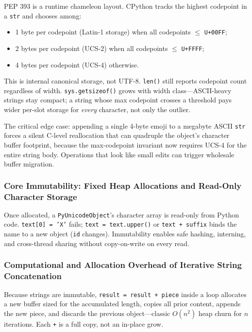 \documentclass[a4paper,twoside]{report}
\begin{document}
PEP 393 is a runtime chameleon layout. CPython tracks the highest codepoint in a \texttt{str} and chooses among:

\begin{itemize}
    \item 1 byte per codepoint (Latin-1 storage) when all codepoints $\leq$ \texttt{U+00FF};
    \item 2 bytes per codepoint (UCS-2) when all codepoints $\leq$ \texttt{U+FFFF};
    \item 4 bytes per codepoint (UCS-4) otherwise.
\end{itemize}

This is internal canonical storage, not UTF-8. \texttt{len()} still reports codepoint count regardless of width. \texttt{sys.getsizeof()} grows with width class---ASCII-heavy strings stay compact; a string whose max codepoint crosses a threshold pays wider per-slot storage for \emph{every} character, not only the outlier.

The critical edge case: appending a single 4-byte emoji to a megabyte ASCII \texttt{str} forces a silent C-level reallocation that can quadruple the object's character buffer footprint, because the max-codepoint invariant now requires UCS-4 for the entire string body. Operations that look like small edits can trigger wholesale buffer migration.

\subsubsection{Core Immutability: Fixed Heap Allocations and Read-Only Character Storage}

Once allocated, a \texttt{PyUnicodeObject}'s character array is read-only from Python code. \texttt{text[0] = 'X'} fails; \texttt{text = text.upper()} or \texttt{text + suffix} binds the name to a new object (\texttt{id} changes). Immutability enables safe hashing, interning, and cross-thread sharing without copy-on-write on every read.

\subsubsection{Computational and Allocation Overhead of Iterative String Concatenation}

Because strings are immutable, \texttt{result = result + piece} inside a loop allocates a new buffer sized for the accumulated length, copies all prior content, appends the new piece, and discards the previous object---classic $O(n^2)$ heap churn for $n$ iterations. Each \texttt{+} is a full copy, not an in-place grow.
\end{document}
